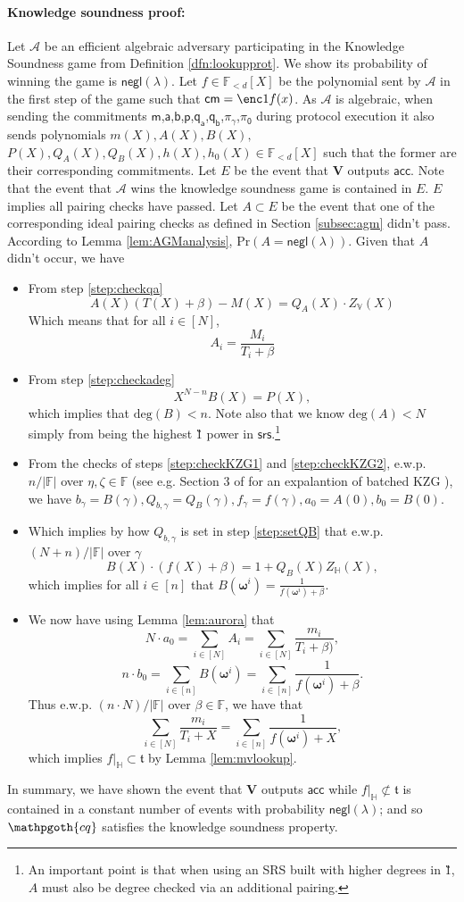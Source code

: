 \documentclass[11pt]{article} %
\newcommand{\cq}{\ensuremath{\mathpgoth{cq} }\xspace}
\newcommand{\F}{\ensuremath{\mathbb F}\xspace}
\newcommand{\adv}{\ensuremath{\mathcal A}\xspace}
\newcommand{\srs}{\ensuremath{\mathsf{srs}}\xspace}
\newcommand{\cm}{\ensuremath{\mathsf{cm}}\xspace}
\renewcommand{\deg}{\ensuremath{\mathrm{deg}}\xspace}
\newcommand{\negl}{\ensuremath{\mathsf{negl}(\lambda)}\xspace}
\newcommand{\acc}{\ensuremath{\mathsf{acc}}\xspace}
\newcommand{\ver}{\ensuremath{\mathsf{\mathbf{V}}}\xspace}
\newcommand{\hgen}{\ensuremath{\mathbf{\omega}}\xspace}
\newcommand{\polysofdeg}[1]{\ensuremath{\F_{< #1}[X]}\xspace}
\newcommand{\prob}{\ensuremath{\mathrm{Pr}}\xspace}
\newcommand{\restricttoset}[2]{\ensuremath{#1|_{#2}}\xspace}
\newcommand{\subspace}{\ensuremath{\mathbb{H}}\xspace}
\newcommand{\bigspace}{\ensuremath{\mathbb{V}}\xspace}
\newcommand{\witsize}{\ensuremath{n}\xspace}
\newcommand{\tabsize}{\ensuremath{N}\xspace}
\newcommand{\tab}{\ensuremath{\mathfrak{t}}\xspace}
\renewcommand{\a}{\ensuremath{\mathsf{a}}\xspace}
\renewcommand{\b}{\ensuremath{\mathsf{b}}\xspace}
\renewcommand{\p}{\ensuremath{\mathsf{p}}\xspace}
\newcommand{\qa}{\ensuremath{\mathsf{q_a}}\xspace}
\newcommand{\qb}{\ensuremath{\mathsf{q_b}}\xspace}
\newcommand{\m}{\ensuremath{\mathsf{m}}\xspace}
\newcommand{\gamproof}{\ensuremath{\mathsf{\pi_\gamma}}\xspace}
\newcommand{\zerproof}{\ensuremath{\mathsf{\pi_0}}\xspace}
\newcommand{\bgam}{\ensuremath{b_\gamma}\xspace}
\newcommand{\qbgam}{\ensuremath{Q_{b,\gamma}}\xspace}
\newcommand{\fgam}{\ensuremath{f_{\gamma}}\xspace}
\begin{document}
\paragraph{Knowledge soundness proof:}
Let \adv be an efficient algebraic adversary participating in the Knowledge Soundness game from
Definition \ref{dfn:lookupprot}.
We show its probability of winning the game is \negl.
Let $f\in \polysofdeg{d}$ be the polynomial sent by \adv in the first step of the game
such that $\cm=\enc1{f(x)}$.
As \adv is algebraic, when sending the commitments \m,\a,\b,\p,\qa,\qb,\gamproof,\zerproof during protocol execution it also sends polynomials $m(X),A(X),B(X),$ $P(X),Q_A(X),Q_B(X),h(X),h_0(X)\in \polysofdeg{d}$ such that the former are their corresponding commitments.
Let $E$ be the event that \ver outputs \acc.
Note that the event that \adv wins the knowledge soundness game is contained in $E$. 
$E$ implies all pairing checks have passed.
Let $A\subset E$ be the event that one of the corresponding ideal pairing checks as defined in Section \ref{subsec:agm} didn't pass.
According to Lemma \ref{lem:AGManalysis}, $\prob(A=\negl)$.
Given that $A$ didn't occur, we have
\begin{itemize}
 \item From step \ref{step:checkqa} \[A(X)(T(X)+\beta)-M(X) = Q_A(X)\cdot Z_\bigspace(X)\]
Which means that for all $i\in [\tabsize]$,
\[A_i=\frac{M_i}{T_i+\beta}\]

\item From step  \ref{step:checkadeg}
\[X^{\tabsize-\witsize}B(X)=P(X),\]
which implies  that  $\deg(B)<\witsize$. Note also that we know $\deg(A)<\tabsize$ simply from \enc1{x^{\tabsize-1}} being the highest \G1 power in \srs.\footnote{An important
point is that when using an SRS built with higher degrees in \G1, $A$ must also be degree checked via an additional pairing.}

\item From the checks of steps \ref{step:checkKZG1} and \ref{step:checkKZG2},  e.w.p. $\witsize/|\F|$ over $\eta,\zeta\in\F$ (see e.g. Section 3 of \cite{plonk} for an expalantion of batched KZG \cite{kate}), we have  
$\bgam = B(\gamma),\qbgam =Q_B(\gamma),\fgam =f(\gamma),a_0=A(0),b_0=B(0)$.

\item Which implies by how \qbgam is set in step \ref{step:setQB}  that e.w.p. $(\tabsize+ \witsize)/|\F|$ over $\gamma$ 
\[B(X)\cdot (f(X)+\beta)=1+ Q_B(X)Z_\subspace(X),\]
which implies for all $i\in [\witsize]$ that
$B(\hgen^i)=\frac{1}{f(\hgen^i)+\beta}$.
\item We now have using Lemma \ref{lem:aurora} that
\[\tabsize\cdot a_0 = \sum_{i\in [\tabsize]} A_i = \sum_{i\in [\tabsize]}\frac{m_i}{T_i+\beta)},\]
\[\witsize\cdot b_0 = \sum_{i\in [\witsize]} B(\hgen^i) = \sum_{i\in [\witsize]}\frac{1}{f(\hgen^i)+\beta}.\]
Thus e.w.p. $(\witsize\cdot \tabsize)/|\F|$ over $\beta\in \F$, we have that
\[\sum_{i\in [\tabsize]}\frac{m_i}{T_i+X}=\sum_{i\in [\witsize]}\frac{1}{f(\hgen^i)+X},\]
which implies $\restricttoset{f}{\subspace}\subset \tab$ by Lemma \ref{lem:mvlookup}.
\end{itemize}
In summary, we have shown the event that \ver outputs \acc while $\restricttoset{f}{\subspace}\not\subset \tab$
is contained in a constant number of events with probability \negl; and so \cq satisfies the knowledge soundness property.


\end{document}
